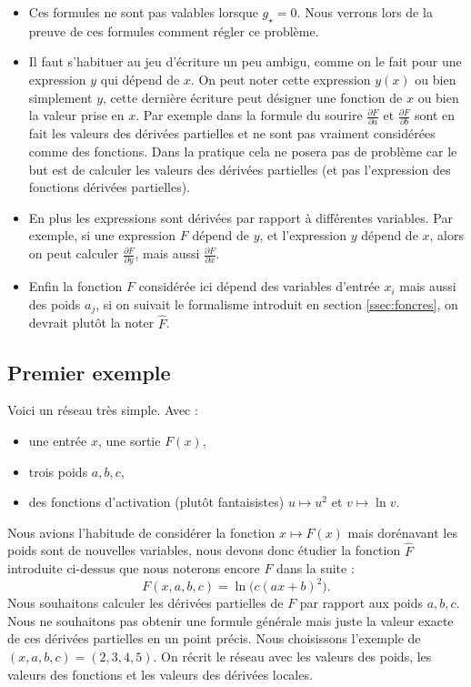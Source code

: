 \documentclass[11pt,class=report,crop=false]{standalone}
\begin{document}
\begin{remarque*}
\sauteligne
\begin{itemize}
  \item Ces formules ne sont pas valables lorsque $g_\star=0$. Nous verrons lors de la preuve de ces formules comment régler ce problème.
  
  \item Il faut s'habituer au jeu d'écriture un peu ambigu, comme on le fait pour une expression $y$ qui dépend de $x$. On peut noter cette expression $y(x)$ ou bien simplement $y$, cette dernière écriture peut désigner une fonction de $x$ ou bien la valeur prise en $x$. Par exemple dans la formule du sourire  $\frac{\partial F}{\partial a}$ et $ \frac{\partial F}{\partial b}$ sont en fait les valeurs des dérivées partielles et ne sont pas vraiment considérées comme des fonctions. Dans la pratique cela ne posera pas de problème car le but est de calculer les valeurs des dérivées partielles (et pas l'expression des fonctions dérivées partielles).
  
  \item En plus les expressions sont dérivées par rapport à différentes variables. Par exemple, si une expression $F$ dépend de $y$, et l'expression $y$ dépend de $x$, alors on peut calculer  $\frac{\partial F}{\partial y}$, mais aussi $\frac{\partial F}{\partial x}$. 
  
  \item Enfin la fonction $F$ considérée ici dépend des variables d'entrée $x_i$ mais aussi des poids $a_j$, si on suivait le formalisme introduit en section \ref{ssec:foncres}, on devrait plutôt la noter  $\widehat F$.
\end{itemize}
\end{remarque*}


\subsection{Premier exemple}

Voici un réseau très simple.
Avec :
\begin{itemize}
  \item une entrée $x$, une sortie $F(x)$,
  \item trois poids $a,b,c$,
  \item des fonctions d'activation (plutôt fantaisistes) $u \mapsto u^2$ et $v \mapsto \ln v$.
\end{itemize}
Nous avions l'habitude de considérer la fonction $x \mapsto F(x)$ mais dorénavant les poids sont de nouvelles variables, nous devons donc étudier la fonction 
$\widehat F$ introduite ci-dessus que nous noterons encore $F$ dans la suite :
$$F(x,a,b,c) = \ln\big( c (ax+b)^2 \big).$$
Nous souhaitons calculer les dérivées partielles de $F$ par rapport aux poids $a,b,c$. Nous ne souhaitons pas obtenir une formule générale mais juste la valeur exacte de ces dérivées partielles en un point précis. Nous choisissons l'exemple de 
$(x,a,b,c) = (2,3,4,5)$.
On récrit le réseau avec les valeurs des poids, les valeurs des fonctions et les valeurs des dérivées locales.
\end{document}
